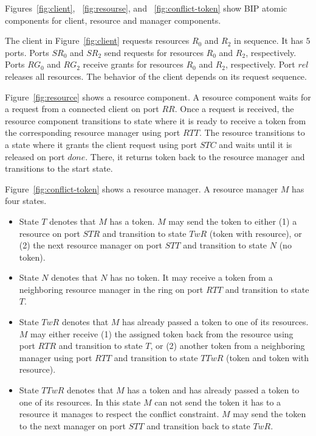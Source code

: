 Figures~\ref{fig:client},
~\ref{fig:resourse}, and
~\ref{fig:conflict-token}
show BIP atomic components for client, resource and manager components. 

The client in Figure~\ref{fig:client} requests resources $R_0$ and $R_2$ in sequence. It has $5$ ports. 
Ports $SR_0$ and $SR_2$ send requests for 
resources $R_0$ and $R_2$, respectively.
Ports $RG_0$ and $RG_2$ receive grants for 
resources $R_0$ and $R_2$, respectively.
Port $rel$ releases all resources. 
The behavior of the client depends on its request sequence. 

Figure~\ref{fig:resource} shows a resource component. 
A resource component waits for a request from a connected client on port $RR$. 
Once a request is received, the resource component transitions to state where it is ready to 
receive a token from the corresponding resource manager using port $RTT$.
The resource transitions to a state where it grants the client request using port $STC$ and waits until it is released on port $done$. 
There, it returns token back to the resource manager and transitions to the start state. 

Figure~\ref{fig:conflict-token} shows a resource manager.
A resource manager $M$ has four states. 
\begin{itemize}
  \item State $T$ denotes that $M$ has a token. $M$ may send the token to either 
    (1) a resource on port $STR$ and transition to state $TwR$ (token with resource), or 
    (2) the next resource manager on port $STT$ and transition to state $N$ (no token).
  \item State $N$ denotes that $N$ has no token. 
    It may receive a token from a neighboring resource manager in the ring on port $RTT$ 
    and transition to state $T$. 
  \item State $TwR$ denotes that $M$ has already passed a token to one of its resources. 
    $M$ may either receive (1) the assigned token back from the resource using port $RTR$ and transition to state $T$, 
    or (2) another token from a neighboring manager using port $RTT$ and transition to state $TTwR$ (token and token with resource).
  \item State $TTwR$ denotes that $M$ has a token and has already passed a token to one of its resources. 
    In this state $M$ can not send the token it has to a resource it manages to respect the conflict constraint. 
    $M$ may send the token to the next manager on port $STT$ and transition back to state $TwR$. 
\end{itemize}

